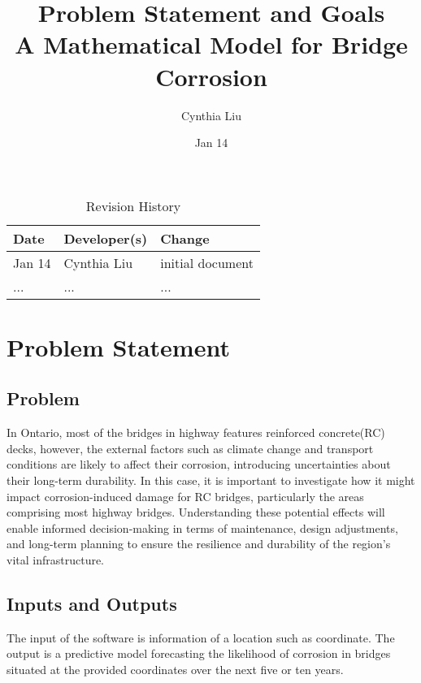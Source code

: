 \documentclass{article}
\title{Problem Statement and Goals\\A Mathematical Model for Bridge Corrosion}
\author{Cynthia Liu}
\date{Jan 14}
\begin{document}
\maketitle

\begin{table}[hp]
\caption{Revision History} \label{TblRevisionHistory}
\begin{tabularx}{\textwidth}{llX}
\toprule
\textbf{Date} & \textbf{Developer(s)} & \textbf{Change}\\
\midrule
Jan 14 & Cynthia Liu & initial document\\
... & ... & ...\\
\bottomrule
\end{tabularx}
\end{table}

\section{Problem Statement}

\subsection{Problem}
In Ontario, most of the bridges in highway features reinforced concrete(RC) decks, however, the external factors such as climate change and transport conditions are likely to affect their corrosion, introducing uncertainties about their long-term durability. In this case, it is important to investigate how it might impact corrosion-induced damage for RC bridges, particularly the areas comprising most highway bridges. Understanding these potential effects will enable informed decision-making in terms of maintenance, design adjustments, and long-term planning to ensure the resilience and durability of the region's vital infrastructure.

\subsection{Inputs and Outputs}
The input of the software is information of a location such as coordinate. The output is a predictive model forecasting the likelihood of corrosion in bridges situated at the provided coordinates over the next five or ten years.
\end{document}
